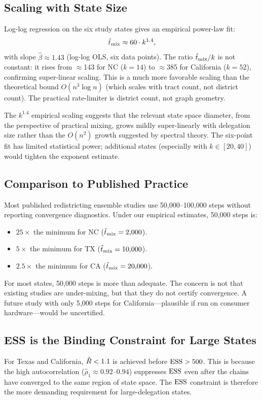 \subsection{Scaling with State Size}

Log-log regression on the six study states gives an empirical power-law fit:
\[
  \hat{t}_{\rm mix} \approx 60 \cdot k^{1.4},
\]
with slope $\hat\beta \approx 1.43$ (log-log OLS, six data points).
The ratio $\hat{t}_{\rm mix}/k$ is not constant: it rises from $\approx$143
for NC ($k=14$) to $\approx$385 for California ($k=52$), confirming
super-linear scaling.
This is a much more favorable scaling than the theoretical bound
$O(n^3 \log n)$ (which scales with tract count, not district count).
The practical rate-limiter is district count, not graph geometry.

The $k^{1.4}$ empirical scaling suggests that the relevant state space
diameter, from the perspective of practical mixing, grows mildly
super-linearly with delegation size rather than the $O(n^2)$ growth
suggested by spectral theory.
The six-point fit has limited statistical power; additional states
(especially with $k \in [20,40]$) would tighten the exponent estimate.

\subsection{Comparison to Published Practice}

Most published redistricting ensemble studies use 50{,}000--100{,}000
steps without reporting convergence diagnostics.
Under our empirical estimates, 50{,}000 steps is:
\begin{itemize}
\item $25\times$ the minimum for NC ($\hat{t}_{\rm mix} = 2{,}000$).
\item $5\times$ the minimum for TX ($\hat{t}_{\rm mix} = 10{,}000$).
\item $2.5\times$ the minimum for CA ($\hat{t}_{\rm mix} = 20{,}000$).
\end{itemize}

For most states, 50{,}000 steps is more than adequate.
The concern is not that existing studies are under-mixing, but that they
do not certify convergence.
A future study with only 5{,}000 steps for California---plausible if run
on consumer hardware---would be uncertified.

\subsection{ESS is the Binding Constraint for Large States}

For Texas and California, $\hat{R} < 1.1$ is achieved before $\mathrm{ESS} > 500$.
This is because the high autocorrelation ($\hat{\rho}_1 \approx 0.92$--$0.94$)
suppresses $\mathrm{ESS}$ even after the chains have converged to the same region
of state space.
The $\mathrm{ESS}$ constraint is therefore the more demanding requirement for
large-delegation states.
